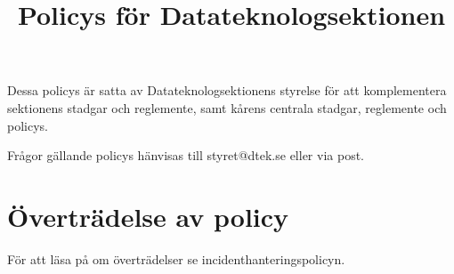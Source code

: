 \documentclass{dtek}
\title{Policys för Datateknologsektionen}
\begin{document}
\maketitle
Dessa policys är satta av Datateknologsektionens styrelse för att komplementera sektionens stadgar och reglemente, samt kårens centrala stadgar, reglemente och policys.

Frågor gällande policys hänvisas till styret@dtek.se eller via post.

\tableofcontents

\newpage

\newpage

\newpage

\newpage

\newpage

\newpage

\section{Överträdelse av policy}
För att läsa på om överträdelser se incidenthanteringspolicyn.

\end{document}
